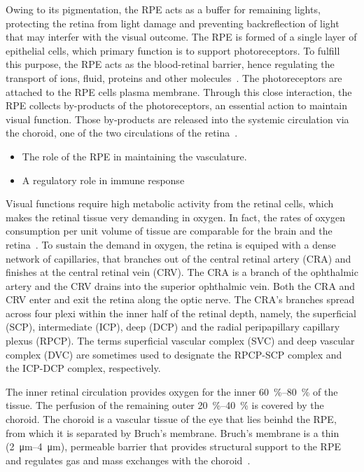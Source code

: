 \documentclass[12pt,a4paper]{journal}
\begin{document}
Owing to its pigmentation, the RPE acts as a buffer for remaining lights, protecting the retina from light damage and preventing backreflection of light that may interfer with the visual outcome.
The RPE is formed of a single layer of epithelial cells, which primary function is to support photoreceptors.
To fulfill this purpose, the RPE acts as the blood-retinal barrier, hence regulating the transport of ions, fluid, proteins and other molecules~\cite{Boulton_2001}.
The photoreceptors are attached to the RPE cells plasma membrane.
Through this close interaction, the RPE collects by-products of the photoreceptors, an essential action to maintain visual function.
Those by-products are released into the systemic circulation via the choroid, one of the two circulations of the retina~\cite{Boulton_2001}.
\begin{itemize}
\item The role of the RPE in maintaining the vasculature.
\item A regulatory role in immune response
\end{itemize}


Visual functions require high metabolic activity from the retinal cells, which makes the retinal tissue very demanding in oxygen.
In fact, the rates of oxygen consumption per unit volume of tissue are comparable for the brain and the retina~\cite{Medrano_1995}.
To sustain the demand in oxygen, the retina is equiped with a dense network of capillaries, that branches out of the central retinal artery (CRA) and finishes at the central retinal vein (CRV).
The CRA is a branch of the ophthalmic artery and the CRV drains into the superior ophthalmic vein.
Both the CRA and CRV enter and exit the retina along the optic nerve.
The CRA's branches spread across four plexi within the inner half of the retinal depth, namely, the superficial (SCP), intermediate (ICP), deep (DCP) and the radial peripapillary capillary plexus (RPCP).
The terms superficial vascular complex (SVC) and deep vascular complex (DVC) are sometimes used to designate the RPCP-SCP complex and the ICP-DCP complex, respectively.

The inner retinal circulation provides oxygen for the inner \SIrange{60}{80}{\percent} of the tissue.
The perfusion of the remaining outer \SIrange{20}{40}{\percent} is covered by the choroid.
The choroid is a vascular tissue of the eye that lies beinhd the RPE, from which it is separated by Bruch's membrane.
Bruch's membrane is a thin (\SIrange{2}{4}{\micro\meter}), permeable barrier that provides structural support to the RPE and regulates gas and mass exchanges with the choroid~\cite{Curcio_2013}.
\end{document}
